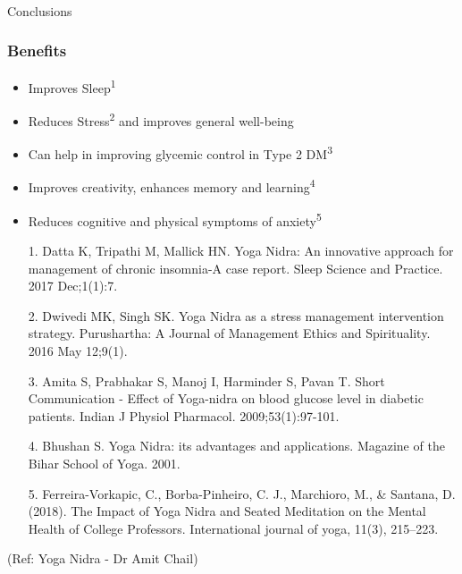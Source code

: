 \begin{frame}[fragile]\frametitle{}
\begin{center}
{\Large Conclusions}
\end{center}
\end{frame}

\begin{frame}[fragile]\frametitle{Benefits}


    \begin{itemize}
        \item Improves Sleep\textsuperscript{1}
        \item Reduces Stress\textsuperscript{2} and improves general well-being
        \item Can help in improving glycemic control in Type 2 DM\textsuperscript{3}
        \item Improves creativity, enhances memory and learning\textsuperscript{4}
        \item Reduces cognitive and physical symptoms of anxiety\textsuperscript{5}
    \end{itemize}
    \begin{itemize}
        \item[1.] Datta K, Tripathi M, Mallick HN. Yoga Nidra: An innovative approach for management of chronic insomnia-A case report. Sleep Science and Practice. 2017 Dec;1(1):7.
        \item[2.] Dwivedi MK, Singh SK. Yoga Nidra as a stress management intervention strategy. Purushartha: A Journal of Management Ethics and Spirituality. 2016 May 12;9(1).
        \item[3.] Amita S, Prabhakar S, Manoj I, Harminder S, Pavan T. Short Communication - Effect of Yoga-nidra on blood glucose level in diabetic patients. Indian J Physiol Pharmacol. 2009;53(1):97-101.
        \item[4.] Bhushan S. Yoga Nidra: its advantages and applications. Magazine of the Bihar School of Yoga. 2001.
        \item[5.] Ferreira-Vorkapic, C., Borba-Pinheiro, C. J., Marchioro, M., \& Santana, D. (2018). The Impact of Yoga Nidra and Seated Meditation on the Mental Health of College Professors. International journal of yoga, 11(3), 215–223.
    \end{itemize}
	
		{\tiny (Ref: Yoga Nidra - Dr Amit Chail)}		

\end{frame}

